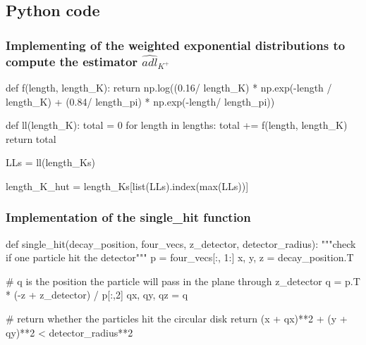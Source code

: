 \documentclass[12pt,a4paper,oneside,english]{article}
\begin{document}
\subsection{Python code}
\subsubsection{Implementing of the weighted exponential distributions to compute the estimator $\widehat{adl}_{K^+}$}
\label{subsubse: estimator_code}
\begin{shaded}
\begin{python}
def f(length, length_K):
    return np.log((0.16/ length_K) * np.exp(-length / length_K) + (0.84/ length_pi) * np.exp(-length/ length_pi))

def ll(length_K):
    total = 0
    for length in lengths:
        total += f(length, length_K)
    return total

LLs = ll(length_Ks)

length_K_hut = length_Ks[list(LLs).index(max(LLs))]
\end{python}
\end{shaded}
\subsubsection{Implementation of the single\_hit function}
\label{subsubse: single_hit_code}
\begin{shaded}
	\begin{python}
def single_hit(decay_position, four_vecs, z_detector, detector_radius):
"""check if one particle hit the detector"""
	p = four_vecs[:, 1:]
	x, y, z = decay_position.T
	
	# q is the position the particle will pass in the plane through z_detector
	q = p.T * (-z + z_detector) / p[:,2]
	qx, qy, qz = q
	
	# return whether the particles hit the circular disk
	return (x + qx)**2 + (y + qy)**2 < detector_radius**2
	
		\end{python}
\end{shaded}
\end{document}

